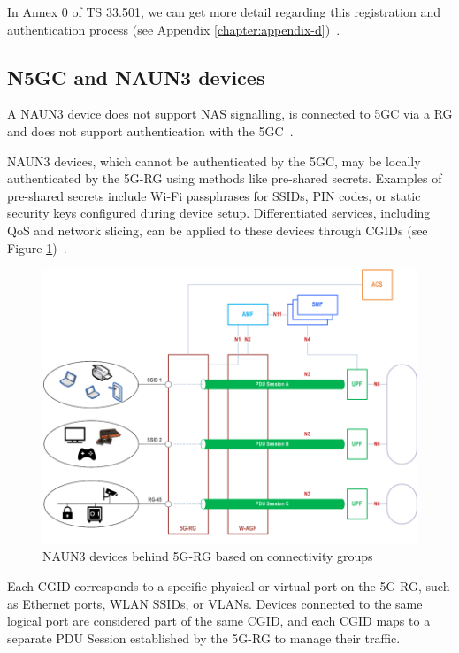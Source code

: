 In Annex 0 of TS 33.501, we can get more detail regarding this registration and authentication process (see Appendix \ref{chapter:appendix-d})~\cite{33.501-p279}.

\subsection{\acs{N5GC} and \acs{NAUN3} devices}

A \acf{NAUN3} device does not support \ac{NAS} signalling, is connected to \ac{5GC} via a \ac{RG} and does not support authentication with the \ac{5GC}~\cite{23.316-p10}.

\ac{NAUN3} devices, which cannot be authenticated by the \ac{5GC}, may be locally authenticated by the \ac{5G-RG} using methods like pre-shared secrets. Examples of pre-shared secrets include Wi-Fi passphrases for \acp{SSID}, \ac{PIN} codes, or static security keys configured during device setup. Differentiated services, including \ac{QoS} and network slicing, can be applied to these devices through \acp{CGID} (see Figure \ref{fig:NAUN3 devices behind 5G-RG based on connectivity groups})~\cite{23.316-p27}.

\begin{figure}
    \centering
    \includegraphics[width=0.75\linewidth]{figs/NAUN3 devices behind 5G-RG based on connectivity groups.png}
    \caption{\acs{NAUN3} devices behind \acs{5G-RG} based on connectivity groups}
    \label{fig:NAUN3 devices behind 5G-RG based on connectivity groups}
\end{figure}

Each \ac{CGID} corresponds to a specific physical or virtual port on the \ac{5G-RG}, such as Ethernet ports, \ac{WLAN} \acp{SSID}, or \acp{VLAN}. Devices connected to the same logical port are considered part of the same \ac{CGID}, and each \ac{CGID} maps to a separate \ac{PDU} Session established by the \ac{5G-RG} to manage their traffic.

